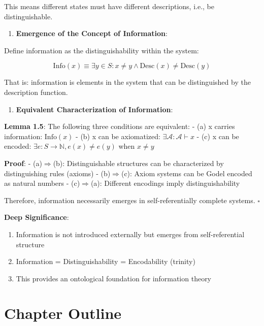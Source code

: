   This means different states must have different descriptions, i.e., be distinguishable.

\begin{enumerate}
\item \textbf{Emergence of the Concept of Information}:
\end{enumerate}
  Define information as the distinguishability within the system:
  
\begin{equation}
\text{Info}(x) \equiv \exists y \in S: x \neq y \land \text{Desc}(x) \neq \text{Desc}(y)
\end{equation}
  
  That is: information is elements in the system that can be distinguished by the description function.
\begin{enumerate}
\item \textbf{Equivalent Characterization of Information}:
\end{enumerate}
  
  \textbf{Lemma 1.5}: The following three conditions are equivalent:
\label{lem:1.5}
  - (a) x carries information: $\text{Info}(x)$
  - (b) x can be axiomatized: $\exists \mathcal{A}: \mathcal{A} \vdash x$
  - (c) x can be encoded: $\exists e: S \to \mathbb{N}, e(x) \neq e(y)$ when $x \neq y$
  
  \textbf{Proof}:
  - (a)$\Rightarrow$(b): Distinguishable structures can be characterized by distinguishing rules (axioms)
  - (b)$\Rightarrow$(c): Axiom systems can be Godel encoded as natural numbers
  - (c)$\Rightarrow$(a): Different encodings imply distinguishability

Therefore, information necessarily emerges in self-referentially complete systems. $\square$

\textbf{Deep Significance}:
\begin{enumerate}
\item Information is not introduced externally but emerges from self-referential structure
\item Information = Distinguishability = Encodability (trinity)
\item This provides an ontological foundation for information theory
\end{enumerate}

\section{Chapter Outline}
\label{sec:ch01_axiom_and_derivation:chapter-outline}

